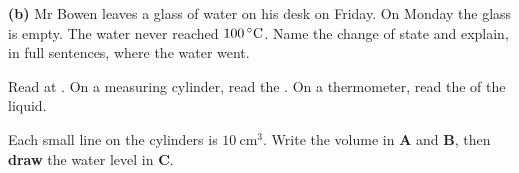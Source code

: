 \documentclass[12pt,a4paper]{article}
\newcommand{\qlines}[1]{\par\needspace{\numexpr#1+1\relax\baselineskip}\wlines{#1}}
\begin{document}
\vspace{9pt}
\noindent \textbf{(b)} Mr Bowen leaves a glass of water on his desk on Friday. On
Monday the glass is empty. The water never reached $100\,^{\circ}\mathrm{C}$. Name the change of state
and explain, in full sentences, where the water went.
\qlines{2}


\begin{remember}
  Read at . On a measuring cylinder, read the . On a thermometer, read the  of the liquid.
\end{remember}

\noindent Each small line on the cylinders is $10\ \mathrm{cm^3}$. Write the volume in
\textbf{A} and \textbf{B}, then \textbf{draw} the water level in \textbf{C}.
\end{document}
